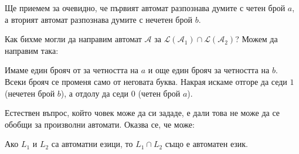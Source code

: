 Ще приемем за очевидно, че първият автомат разпознава думите с четен брой $a$,
а вторият автомат разпознава думите с нечетен брой $b$.

Как бихме могли да направим автомат $\mathcal{A}$ за $\mathcal{L}(\mathcal{A}_1) \cap \mathcal{L}(\mathcal{A}_2)$?
Можем да направим така:

\begin{center}
\end{center}

Имаме един брояч от за четността на $a$ и още един брояч за четността на $b$.
Всеки брояч се променя само от неговата буква.
Накрая искаме отгоре да седи $1$ (нечетен брой $b$), а отдолу да седи $0$ (четен брой $a$).

Естествен въпрос, който човек може да си зададе, е дали това не може да се обобщи за произволни автомати.
Оказва се, че може:

\begin{claim}
    Ако $L_1$ и $L_2$ са автоматни езици, то $L_1 \cap L_2$ също е автоматен език.
\end{claim}

